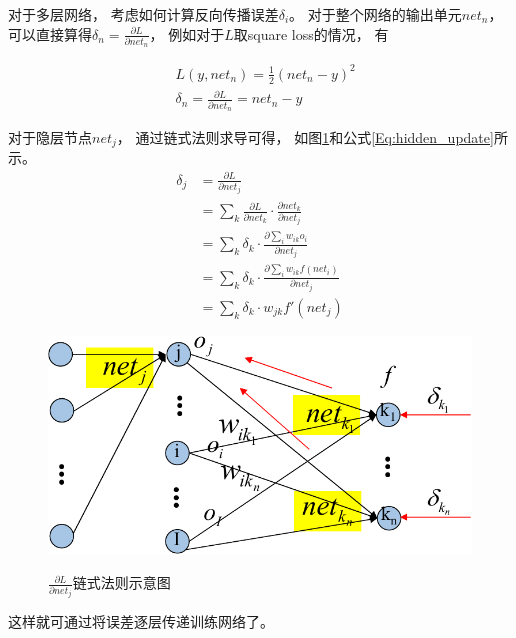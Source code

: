 对于多层网络， 考虑如何计算反向传播误差$\delta_{i}$。 对于整个网络的输出单元$net_n$， 可以直接算得$\delta_n = \frac{\partial L}{\partial net_n}$， 例如对于$L$取square loss的情况， 有


\begin{equation}
\begin{split}
&	L(y,net_n)=\frac{1}{2}(net_n-y)^2 \\
&	\delta_n = \frac{\partial L}{\partial net_n} = net_n - y
\end{split}
\end{equation}


对于隐层节点$net_j$， 通过链式法则求导可得， 如图\ref{fig:update_weight_2}和公式\ref{Eq:hidden_update}所示。 
\begin{equation}\label{Eq:hidden_update}
\begin{split}
\delta_j
	&=\frac{\partial L}{\partial net_j}\\
	&=\sum_{k}\frac{\partial L}{\partial net_k}\cdot \frac{\partial net_k}{\partial net_j}\\
	&=\sum_k \delta_{k} \cdot \frac{\partial \sum_i{w_{ik}o_i}}{\partial net_j}\\
	&=\sum_k \delta_{k} \cdot \frac{\partial \sum_i{w_{ik}f(net_i)}}{\partial net_j}\\
	&=\sum_k \delta_{k} \cdot w_{jk} f'(net_j)
\end{split}
\end{equation}

\begin{figure}[htb]
  \centering
  \includegraphics[scale=0.8]{Pictures/CNN/weight_update_2-crop.pdf}\\
  \caption{$\frac{\partial L}{\partial net_j}$链式法则示意图}\label{fig:update_weight_2}
\end{figure}

这样就可通过将误差逐层传递训练网络了。 

